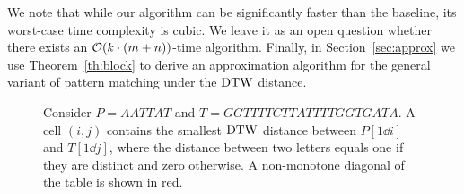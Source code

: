 We note that while our algorithm can be significantly faster than the baseline, its worst-case time complexity is cubic. We leave it as an open question whether there exists an $\mathcal{O}(k \cdot (m+n))$-time algorithm.  Finally, in Section~\ref{sec:approx} we use Theorem~\ref{th:block} to derive an approximation algorithm for the general variant of pattern matching under the $\mathrm{DTW}$ distance. 

\begin{figure}[H]
\caption{Consider $P = AATTAT$ and $T=GGTTTTCTTATTTTGGTGATA$. A cell $(i,j)$ contains the smallest $\mathrm{DTW}$ distance between $P[1\dd i]$ and $T[1\dd j]$, where the distance between two letters equals one if they are distinct and zero otherwise. A non-monotone diagonal of the table is shown in red.}  
\label{fig:decreasing}
\end{figure}
